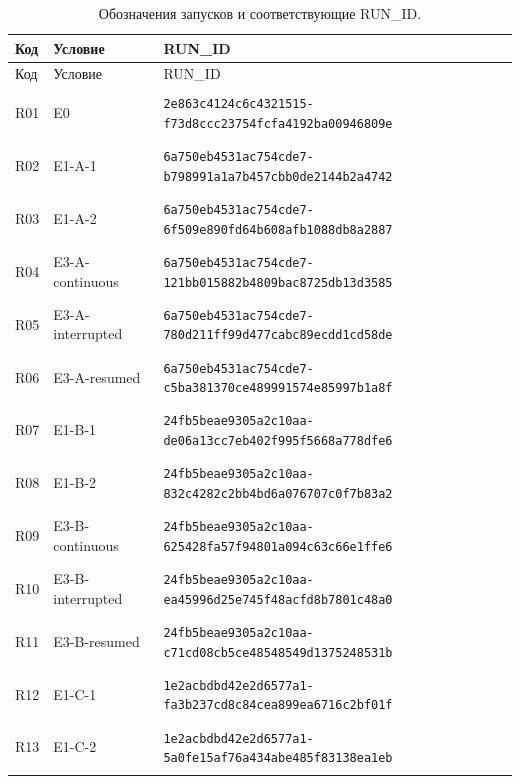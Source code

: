 \begin{longtable}{@{}l>{\raggedright\arraybackslash}p{3.7cm}p{10.8cm}@{}}
\caption{Обозначения запусков и соответствующие RUN\_ID.}\label{tab:runs}\\
\toprule Код & Условие & RUN\_ID \\ \midrule \endfirsthead
\toprule Код & Условие & RUN\_ID \\ \midrule \endhead
\bottomrule\endfoot
\hypertarget{R01}{R01} & E0 & {\fontsize{9.2}{11}\selectfont\texttt{2e863c4124c6c4321515-f73d8ccc23754fcfa4192ba00946809e}} \\
\hypertarget{R02}{R02} & E1-A-1 & {\fontsize{9.2}{11}\selectfont\texttt{6a750eb4531ac754cde7-b798991a1a7b457cbb0de2144b2a4742}} \\
\hypertarget{R03}{R03} & E1-A-2 & {\fontsize{9.2}{11}\selectfont\texttt{6a750eb4531ac754cde7-6f509e890fd64b608afb1088db8a2887}} \\
\hypertarget{R04}{R04} & E3-A-continuous & {\fontsize{9.2}{11}\selectfont\texttt{6a750eb4531ac754cde7-121bb015882b4809bac8725db13d3585}} \\
\hypertarget{R05}{R05} & E3-A-interrupted & {\fontsize{9.2}{11}\selectfont\texttt{6a750eb4531ac754cde7-780d211ff99d477cabc89ecdd1cd58de}} \\
\hypertarget{R06}{R06} & E3-A-resumed & {\fontsize{9.2}{11}\selectfont\texttt{6a750eb4531ac754cde7-c5ba381370ce489991574e85997b1a8f}} \\
\hypertarget{R07}{R07} & E1-B-1 & {\fontsize{9.2}{11}\selectfont\texttt{24fb5beae9305a2c10aa-de06a13cc7eb402f995f5668a778dfe6}} \\
\hypertarget{R08}{R08} & E1-B-2 & {\fontsize{9.2}{11}\selectfont\texttt{24fb5beae9305a2c10aa-832c4282c2bb4bd6a076707c0f7b83a2}} \\
\hypertarget{R09}{R09} & E3-B-continuous & {\fontsize{9.2}{11}\selectfont\texttt{24fb5beae9305a2c10aa-625428fa57f94801a094c63c66e1ffe6}} \\
\hypertarget{R10}{R10} & E3-B-interrupted & {\fontsize{9.2}{11}\selectfont\texttt{24fb5beae9305a2c10aa-ea45996d25e745f48acfd8b7801c48a0}} \\
\hypertarget{R11}{R11} & E3-B-resumed & {\fontsize{9.2}{11}\selectfont\texttt{24fb5beae9305a2c10aa-c71cd08cb5ce48548549d1375248531b}} \\
\hypertarget{R12}{R12} & E1-C-1 & {\fontsize{9.2}{11}\selectfont\texttt{1e2acbdbd42e2d6577a1-fa3b237cd8c84cea899ea6716c2bf01f}} \\
\hypertarget{R13}{R13} & E1-C-2 & {\fontsize{9.2}{11}\selectfont\texttt{1e2acbdbd42e2d6577a1-5a0fe15af76a434abe485f83138ea1eb}} \\

\end{longtable}
